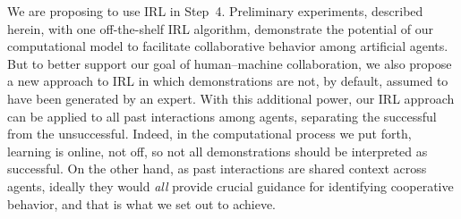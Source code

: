 We are proposing to use IRL in Step~4.  Preliminary experiments,
described herein, with one off-the-shelf IRL algorithm, demonstrate
the potential of our computational model to facilitate collaborative
behavior among artificial agents.
%
But to better support our goal of human--machine collaboration, we
also propose a new approach to IRL in which demonstrations are not, by
default, assumed to have been generated by an expert.
%
With this additional power, our IRL approach can be applied to all
past interactions among agents, separating the successful from the
unsuccessful.
%
%
Indeed, in the computational process we put forth, learning is online,
not off, so not all demonstrations should be interpreted as
successful.  On the other hand, as past interactions are shared
context across agents, ideally they would \emph{all\/} provide crucial
guidance for identifying cooperative behavior, and that is what we set
out to achieve.

